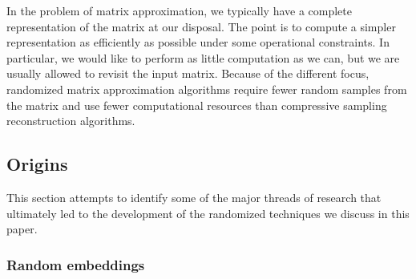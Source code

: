 \documentclass[final]{siamltex}
\newcounter{algorithm}[section]
\newcommand{\notate}[1]{\textcolor{red}{\textbf{[#1]}}}
\begin{document}
In the problem of matrix approximation, we typically have a complete representation
of the matrix at our disposal.  The point is to compute a simpler representation
as efficiently as possible under some operational constraints.  In particular,
we would like to perform as little computation as we can, but we are usually
allowed to revisit the input matrix.  Because of the
different focus, randomized matrix approximation algorithms require fewer random
samples from the matrix and use fewer computational resources than
compressive sampling reconstruction algorithms.










\subsection{Origins}

This section attempts to identify some
of the major threads of research that ultimately led to the development
of the randomized techniques we discuss in this paper.




\subsubsection{Random embeddings}
\end{document}
